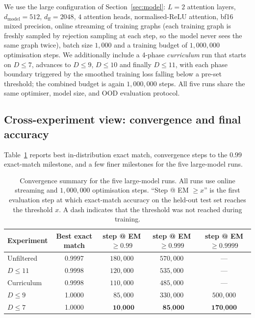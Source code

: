 \documentclass[11pt,a4paper]{article}
\begin{document}
We use the large configuration of Section~\ref{sec:model}: $L = 2$
attention layers, $d_{\mathrm{model}} = 512$, $d_{\mathrm{ff}} = 2048$,
$4$ attention heads, normalised-ReLU attention, bf16 mixed precision,
online streaming of training graphs (each training graph is freshly
sampled by rejection sampling at each step, so the model never sees the
same graph twice), batch size $1{,}000$ and a training budget of
$1{,}000{,}000$ optimisation steps. We additionally include a 4-phase
\emph{curriculum} run that starts on $D \le 7$, advances to $D \le 9$,
$D \le 10$ and finally $D \le 11$, with each phase boundary triggered by
the smoothed training loss falling below a pre-set threshold; the
combined budget is again $1{,}000{,}000$ steps. All five runs share the
same optimiser, model size, and OOD evaluation protocol.

\subsection{Cross-experiment view: convergence and final accuracy}

Table~\ref{tab:big-summary} reports best in-distribution exact match,
convergence steps to the $0.99$ exact-match milestone, and a few finer
milestones for the five large-model runs.

\begin{table}[H]
\centering
\begin{tabular}{lcccc}
\toprule
Experiment & Best exact match & step @ EM $\ge 0.99$ & step @ EM $\ge 0.999$ & step @ EM $\ge 0.9999$ \\
\midrule
Unfiltered   & 0.9997 & $180{,}000$ & $570{,}000$ & --- \\
$D \le 11$   & 0.9998 & $120{,}000$ & $535{,}000$ & --- \\
Curriculum   & 0.9998 & $110{,}000$ & $485{,}000$ & --- \\
$D \le 9$    & 1.0000 & $\phantom{0}85{,}000$ & $330{,}000$ & $500{,}000$ \\
$D \le 7$    & 1.0000 & $\phantom{0}\textbf{10{,}000}$ & $\phantom{0}\textbf{85{,}000}$ & $\textbf{170{,}000}$ \\
\bottomrule
\end{tabular}
\caption{Convergence summary for the five large-model runs. All runs use
online streaming and $1{,}000{,}000$ optimisation steps.
``Step @ EM $\ge x$'' is the first evaluation step at which exact-match
accuracy on the held-out test set reaches the threshold $x$. A dash
indicates that the threshold was not reached during training.}
\label{tab:big-summary}
\end{table}
\end{document}
